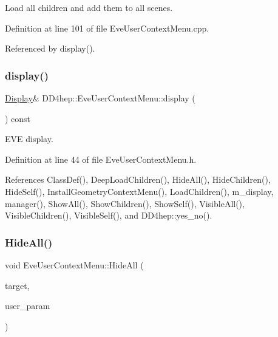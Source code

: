 Load all children and add them to all scenes. 



Definition at line 101 of file Eve\+User\+Context\+Menu.\+cpp.



Referenced by display().

\hypertarget{class_d_d4hep_1_1_eve_user_context_menu_abd487675cc72b214d613cd34d57a9230}{}\label{class_d_d4hep_1_1_eve_user_context_menu_abd487675cc72b214d613cd34d57a9230} 
\subsubsection{\texorpdfstring{display()}{display()}}
{\footnotesize\ttfamily \hyperlink{class_d_d4hep_1_1_display}{Display}\& D\+D4hep\+::\+Eve\+User\+Context\+Menu\+::display (\begin{DoxyParamCaption}{ }\end{DoxyParamCaption}) const\hspace{0.3cm}{\ttfamily [inline]}}



E\+VE display. 



Definition at line 44 of file Eve\+User\+Context\+Menu.\+h.



References Class\+Def(), Deep\+Load\+Children(), Hide\+All(), Hide\+Children(), Hide\+Self(), Install\+Geometry\+Context\+Menu(), Load\+Children(), m\+\_\+display, manager(), Show\+All(), Show\+Children(), Show\+Self(), Visible\+All(), Visible\+Children(), Visible\+Self(), and D\+D4hep\+::yes\+\_\+no().

\hypertarget{class_d_d4hep_1_1_eve_user_context_menu_a9aad9343ba738d4e4fdbfe80ecdcec4e}{}\label{class_d_d4hep_1_1_eve_user_context_menu_a9aad9343ba738d4e4fdbfe80ecdcec4e} 
\subsubsection{\texorpdfstring{Hide\+All()}{HideAll()}}
{\footnotesize\ttfamily void Eve\+User\+Context\+Menu\+::\+Hide\+All (\begin{DoxyParamCaption}\item[{\hyperlink{class_t_object}{T\+Object} $\ast$}]{target,  }\item[{void $\ast$}]{user\+\_\+param }\end{DoxyParamCaption})}



